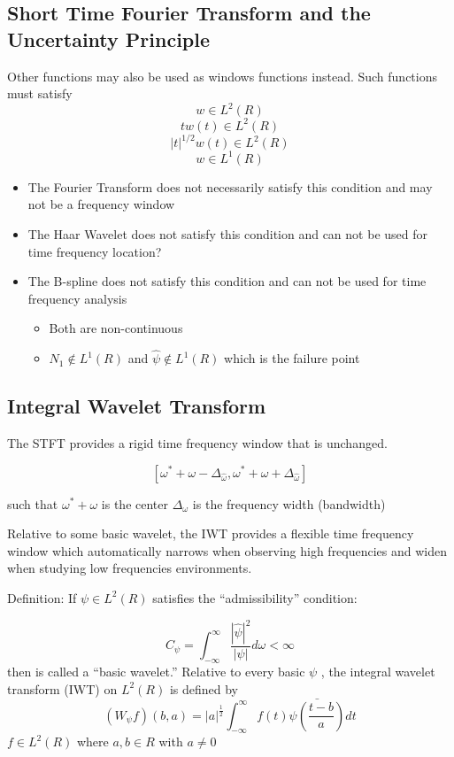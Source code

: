 \documentclass[11pt]{article}
\begin{document}
\subsection {Short Time Fourier Transform and the Uncertainty Principle}

Other functions may also be used as windows functions instead.  Such functions must satisfy 
\[w\in L^2(R) \]
\[t w(t) \in L^2(R) \]
\[  |t|^{1/2} w(t) \in L^2(R)  \]
\[w\in L^1 (R) \]
\begin{itemize}
\item The Fourier Transform does not necessarily satisfy this condition and may not be a frequency window 
\item The Haar Wavelet does not satisfy this condition and can not be used for time frequency location?
\item The B-spline does not satisfy this condition and can not be used for time frequency analysis
\begin{itemize}
\item Both are non-continuous 
\item $N_1 \not\in L^1 (R) $ and $\hat{\psi} \not \in L^1(R)$ which is the failure point
\end{itemize}

\end{itemize}

\subsection {Integral Wavelet Transform}
The STFT provides a rigid time frequency window that is unchanged.  

\[ [\omega ^\ast + \omega - \Delta _{\hat{\omega}}, \omega ^\ast + \omega + \Delta _{\hat{\omega}} ] \]

such that $\omega ^\ast + \omega$ is the center $\Delta _\omega $ is the frequency width (bandwidth)

Relative to some basic wavelet, the IWT provides a flexible time frequency window which automatically narrows when observing high frequencies  and widen when studying low frequencies environments.

Definition: If $\psi  \in L^2(R)$ satisfies the ``admissibility'' condition: 

\[   C_\psi = \int ^\infty _{-\infty} \frac {|\hat{\psi}|^2}{|\psi|} d\omega < \infty \]
then  \psi is called a ``basic wavelet.''  Relative to every basic $\psi$ , the integral wavelet transform (IWT) on $L^2 (R)$ is defined by 
\[ (W_\psi f) (b,a) = |a|^\frac{1}{2} \int ^\infty _{-\infty} f(t) \bar {\psi (\frac{t-b}{a})} dt \]
$f \in L^2 (R) $ where $a,b \in R$ with $a \not= 0$ 
\end{document}
